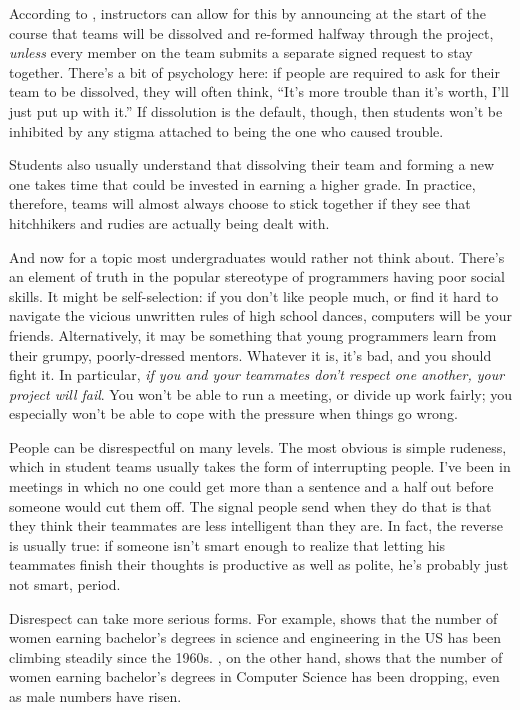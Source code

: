 \documentclass{report}
\begin{document}
According to \cite{b:oakley-teams}, instructors can allow for this by
announcing at the start of the course that teams will be dissolved and
re-formed halfway through the project, \emph{unless} every member on
the team submits a separate signed request to stay together.  There's
a bit of psychology here: if people are required to ask for their team
to be dissolved, they will often think, ``It's more trouble than it's
worth, I'll just put up with it.''  If dissolution is the default,
though, then students won't be inhibited by any stigma attached to
being the one who caused trouble.

Students also usually understand that dissolving their team and
forming a new one takes time that could be invested in earning a
higher grade.  In practice, therefore, teams will almost always choose
to stick together if they see that hitchhikers and rudies are actually
being dealt with.


And now for a topic most undergraduates would rather not think about.
There's an element of truth in the popular stereotype of programmers
having poor social skills.  It might be self-selection: if you don't
like people much, or find it hard to navigate the vicious unwritten
rules of high school dances, computers will be your friends.
Alternatively, it may be something that young programmers learn from
their grumpy, poorly-dressed mentors.  Whatever it is, it's bad, and
you should fight it.  In particular, \emph{if you and your teammates
don't respect one another, your project will fail}.  You won't be able
to run a meeting, or divide up work fairly; you especially won't be
able to cope with the pressure when things go wrong.

People can be disrespectful on many levels.  The most obvious is
simple rudeness, which in student teams usually takes the form of
interrupting people.  I've been in meetings in which no one could get
more than a sentence and a half out before someone would cut them
off. The signal people send when they do that is that they think their
teammates are less intelligent than they are.  In fact, the reverse is
usually true: if someone isn't smart enough to realize that letting
his teammates finish their thoughts is productive as well as polite,
he's probably just not smart, period.

Disrespect can take more serious forms.  For example,
 shows that the number of women earning
bachelor's degrees in science and engineering in the US has been
climbing steadily since the 1960s.  , on the other
hand, shows that the number of women earning bachelor's degrees in
Computer Science has been dropping, even as male numbers have risen.
\end{document}
